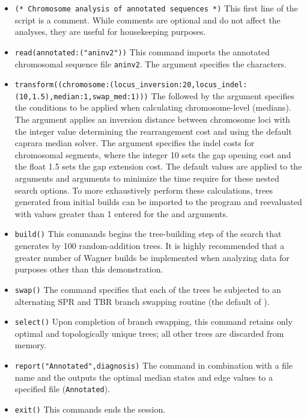 \begin{itemize}
\item \texttt{(* Chromosome analysis of annotated sequences  *)} This first line of the script is a comment. While comments are optional and do not affect the analyses, they are useful for housekeeping purposes.
\item \texttt{read(annotated:("aninv2"))} This command imports the annotated chromosomal sequence file \texttt{aninv2}. The argument  specifies the characters. 
\item \texttt{transform((chromosome:(locus\_inversion:20,locus\_indel:\\(10,1.5),median:1,swap\_med:1)))}  The  follow\-ed by the argument  specifies the conditions to be applied when calculating chromosome-level (medians).  The argument  applies an inversion distance between chromosome loci with the integer value determining the rearrangement cost and using the default caprara median solver. The argument  specifies the indel costs for chromosomal segments, where the integer 10 sets the gap opening cost and the float 1.5 sets the gap extension cost.  The default values are applied to the arguments    and  arguments to minimize the time require for these nested search options.   To more exhaustively perform these calculations, trees generated from initial builds can be imported to the program and reevaluated with values greater than 1 entered for the  and  arguments.
\item \texttt{build()} This commands begins the tree-building step of the search that generates by 100 random-addition trees.  It is highly recommended that a greater number of Wagner builds be implemented when analyzing data for purposes other than this demonstration.
\item \texttt{swap()} The  command specifies that each of the trees be subjected to an alternating SPR and TBR branch swapping routine (the default of \poy).
\item \texttt{select()} Upon completion of branch swapping, this command retains only optimal and topologically unique trees; all other trees are discarded from memory. 
\item \texttt{report("Annotated",diagnosis)}  The  command in combination with a file name and the  outputs the optimal median states and edge values to a specified file (\texttt{Annotated}). 
\item \texttt{exit()} This commands ends the \poy session.
\end{itemize}

